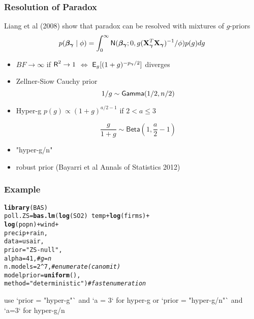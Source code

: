 \documentclass{beamer}\usepackage[]{graphicx}\usepackage[]{color}
\makeatletter
\newcommand{\hlnum}[1]{\textcolor[rgb]{0.686,0.059,0.569}{#1}}%
\newcommand{\hlstr}[1]{\textcolor[rgb]{0.192,0.494,0.8}{#1}}%
\newcommand{\hlcom}[1]{\textcolor[rgb]{0.678,0.584,0.686}{\textit{#1}}}%
\newcommand{\hlopt}[1]{\textcolor[rgb]{0,0,0}{#1}}%
\newcommand{\hlstd}[1]{\textcolor[rgb]{0.345,0.345,0.345}{#1}}%
\newcommand{\hlkwb}[1]{\textcolor[rgb]{0.69,0.353,0.396}{#1}}%
\newcommand{\hlkwc}[1]{\textcolor[rgb]{0.333,0.667,0.333}{#1}}%
\newcommand{\hlkwd}[1]{\textcolor[rgb]{0.737,0.353,0.396}{\textbf{#1}}}%
\newenvironment{kframe}{%
 \def\at@end@of@kframe{}%
 \ifinner\ifhmode%
  \def\at@end@of@kframe{\end{minipage}}%
  \begin{minipage}{\columnwidth}%
 \fi\fi%
 \def\FrameCommand##1{\hskip\@totalleftmargin \hskip-\fboxsep
 \colorbox{shadecolor}{##1}\hskip-\fboxsep
     \hskip-\linewidth \hskip-\@totalleftmargin \hskip\columnwidth}%
 \MakeFramed {\advance\hsize-\width
   \@totalleftmargin\z@ \linewidth\hsize
   \@setminipage}}%
 {\par\unskip\endMakeFramed%
 \at@end@of@kframe}
\newenvironment{knitrout}{}{} %
\makeatother
\begin{document}
\begin{frame} \frametitle{Resolution of Paradox}

Liang et al (2008) show that paradox can be resolved with mixtures of $g$-priors
$$p(\boldsymbol{\beta_\gamma} \mid \phi) = \int_0^{\infty} \textsf{N}(\boldsymbol{\beta_\gamma}; 0, g (\mathbf{X}_{\boldsymbol{\gamma}}^T\mathbf{X}_{\boldsymbol{\gamma}})^{-1}/\phi) p(g) dg$$
\pause

\begin{itemize}
\item  $BF \to \infty$ if $\textsf{R}^2 \to 1$  $\Leftrightarrow$ $\textsf{E}_g[(1 +
g)^{-p_{\boldsymbol{\gamma}}/2}]$ diverges \pause
\item Zellner-Siow Cauchy prior
$$ 1/g \sim \textsf{Gamma}(1/2, n/2)$$ \pause

\item Hyper-g   $p(g) \propto (1 +g )^{a/2 - 1}$ if $2 < a \le 3$

$$\frac{g}{1+g} \sim \textsf{Beta}(1, \frac{a}{2} - 1)$$
\pause
\item "hyper-g/n"
\pause
\item  robust prior (Bayarri et al Annals of Statistics 2012)
\end{itemize}

\end{frame}


\begin{frame}[fragile] \frametitle{Example}


\begin{knitrout}
\color{fgcolor}\begin{kframe}
\begin{alltt}
\hlkwd{library}\hlstd{(BAS)}
\hlstd{poll.ZS} \hlkwb{=} \hlkwd{bas.lm}\hlstd{(}\hlkwd{log}\hlstd{(SO2)} \hlopt{~} \hlstd{temp} \hlopt{+} \hlkwd{log}\hlstd{(firms)} \hlopt{+}
                             \hlkwd{log}\hlstd{(popn)} \hlopt{+} \hlstd{wind} \hlopt{+}
                             \hlstd{precip}\hlopt{+} \hlstd{rain,}
                  \hlkwc{data}\hlstd{=usair,}
                  \hlkwc{prior}\hlstd{=}\hlstr{"ZS-null"}\hlstd{,}
                  \hlkwc{alpha}\hlstd{=}\hlnum{41}\hlstd{,}    \hlcom{# g = n}
                  \hlkwc{n.models}\hlstd{=}\hlnum{2}\hlopt{^}\hlnum{7}\hlstd{,}\hlcom{# enumerate (can omit)}
                  \hlkwc{modelprior}\hlstd{=}\hlkwd{uniform}\hlstd{(),}
                  \hlkwc{method}\hlstd{=}\hlstr{"deterministic"}\hlstd{)}   \hlcom{# fast enumeration}
\end{alltt}
\end{kframe}
\end{knitrout}
 use `prior = "hyper-g"` and `a = 3` for hyper-g or `prior = "hyper-g/n"` and `a=3` for hyper-g/n
\end{frame}
\end{document}
